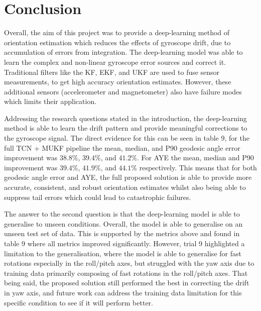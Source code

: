 \newpage
\section{Conclusion}

Overall, the aim of this project was to provide a deep-learning method of orientation estimation which reduces the effects of gyroscope drift, due to accumulation of errors from
integration. The deep-learning model was able to learn the complex and non-linear gyroscope error sources and correct it. Traditional filters like the KF, EKF, and 
UKF are used to fuse sensor measurements, to get high accuracy orientation estimates. However, these additional sensors (accelerometer and magnetometer) also have failure modes which
limits their application.

Addressing the research questions stated in the introduction, the deep-learning method is able to learn the drift pattern and provide meaningful corrections to the gyroscope signal. 
The direct evidence for this can be seen in table 9, for the full TCN + MUKF pipeline the mean, median, and P90 geodesic angle error improvement was $38.8\%$, $39.4\%$, and $41.2\%$. For 
AYE the mean, median and P90 improvement was $39.4\%$, $41.9\%$, and $44.1\%$ respectively. This means that for both geodesic angle error and AYE, the full proposed solution is able
to provide more accurate, consistent, and robust orientation estimates whilst also being able to suppress tail errors which could lead to catastrophic failures.

The answer to the second question is that the deep-learning model is able to generalise to unseen conditions. Overall, the model is able to generalise on an unseen test set of data. This is supported by the metrics above
and found in table 9 where all metrics improved significantly. However, trial 9 highlighted a limitation to the generalisation, where the model is able to generalise for fast rotations especially in the 
roll/pitch axes, but struggled with the yaw axis due to training data primarily composing of fast rotations in the roll/pitch axes. That being said, the proposed solution still performed the best in
correcting the drift in yaw axis, and future work can address the training data limitation for this specific condition to see if it will perform better.

